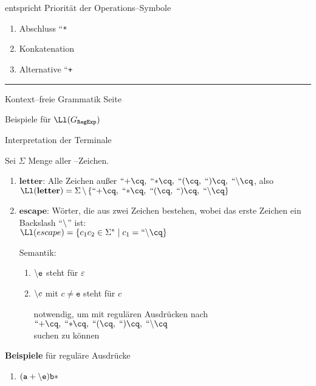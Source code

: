 \begin{slide}{}
entspricht Priorit\"at der Operations--Symbole
\begin{enumerate}
\item Abschluss ``\texttt{*}\cq
\item Konkatenation
\item Alternative ``\texttt{+}\cq
\end{enumerate}

\vspace*{\fill}
\tiny \addtocounter{mypage}{1}
\rule{17cm}{1mm}
Kontext--freie Grammatik  \hspace*{\fill} Seite 
\end{slide}


\begin{slide}{}
\normalsize

\begin{center}
Beispiele f\"ur $\Ll(G_{\mathtt{RegExp}})$
\end{center}
\vspace*{0.5cm}

\footnotesize
Interpretation der Terminale

Sei $\Sigma$ Menge aller --Zeichen. 
\begin{enumerate}
\item $\mathbf{letter}$: Alle Zeichen au{\ss}er $``\mathtt{+}\cq,\; ``\mathtt{*}\cq,\; ``\mathtt{(}\cq,\;
``\mathtt{)}\cq,\; ``\mathtt{\symbol{92}}\cq$, also \\[0.3cm]
      \hspace*{1.3cm} $\Ll(\mathbf{letter}) = \Sigma \,\backslash\, \{ ``\mathtt{+}\cq,\; ``\mathtt{*}\cq,\; ``\mathtt{(}\cq,\;
``\mathtt{)}\cq,\; ``\mathtt{\symbol{92}}\cq \}$
\item $\mathbf{escape}$: W\"orter, die aus zwei Zeichen bestehen, wobei das erste Zeichen
      ein Backslash ``$\symbol{92}$'' ist: \\[0.3cm]
      \hspace*{1.3cm} $\Ll(escape) = \{ c_1c_2 \in \Sigma^* \;|\; c_1 = ``\mathtt{\symbol{92}}\cq \}$

      Semantik:
      \begin{enumerate}
      \item $\mathtt{\symbol{92}e}$ steht f\"ur $\varepsilon$
      \item $\mathtt{\symbol{92}}c$ mit $c \not= \mathtt{e}$ steht f\"ur $c$

            notwendig, um mit regul\"aren Ausdr\"ucken nach \\[0.3cm]
            \hspace*{1.3cm} $``\mathtt{+}\cq,\; ``\mathtt{*}\cq,\; ``\mathtt{(}\cq,\; ``\mathtt{)}\cq,\; ``\mathtt{\symbol{92}}\cq$ \\[0.3cm]
            suchen zu k\"onnen
      \end{enumerate}
\end{enumerate}
\textbf{Beispiele} f\"ur regul\"are Ausdr\"ucke
\begin{enumerate}
\item $\mathtt{(a+\symbol{92}e)b*}$
    

\end{enumerate}
\end{slide}
